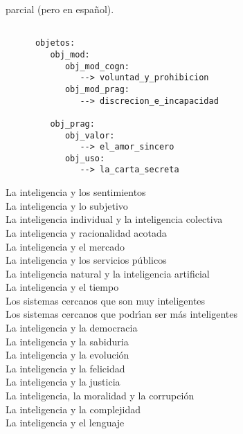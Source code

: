 \documentclass[10pt]{article}
\begin{document}
\begin{huge}

 parcial (pero en espa{\~n}ol).


\begin{verbatim}

      objetos:
         obj_mod:
            obj_mod_cogn:
               --> voluntad_y_prohibicion
            obj_mod_prag:
               --> discrecion_e_incapacidad

         obj_prag:
            obj_valor:
               --> el_amor_sincero
            obj_uso:
               --> la_carta_secreta
\end{verbatim}



\blob La inteligencia y los sentimientos \\
\blob La inteligencia y lo subjetivo \\
\blob La inteligencia individual y la inteligencia colectiva\\
\blob La inteligencia y racionalidad acotada\\
\blob La inteligencia y el mercado\\
\blob La inteligencia y los servicios p{\'u}blicos\\
\blob La inteligencia natural y la inteligencia artificial\\
\blob La inteligencia y el tiempo\\
\blob Los sistemas cercanos que son muy inteligentes\\
\blob Los sistemas cercanos que podr{\'\i}an ser m{\'a}s inteligentes\\
\blob La inteligencia y la democracia\\
\blob La inteligencia y la sabiduria\\
\blob La inteligencia y la evoluci{\'o}n\\
\blob La inteligencia y la felicidad\\
\blob La inteligencia y la justicia\\
\blob La inteligencia, la moralidad y la corrupci{\'o}n\\
\blob La inteligencia y la complejidad\\
\blob La inteligencia y el lenguaje\\


\end{huge}
\end{document}
